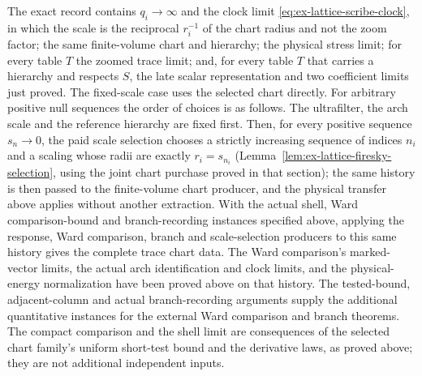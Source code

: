 The exact record contains $q_i\to\infty$ and the clock limit
\eqref{eq:ex-lattice-scribe-clock}, in which the scale is the reciprocal
$r_i^{-1}$ of the chart radius and not the zoom factor;
the same finite-volume
chart and hierarchy; the physical stress limit; for every table $T$ the
zoomed trace limit; and, for every table $T$ that carries a hierarchy and
respects $S$, the late scalar representation and two coefficient limits
just proved. The fixed-scale case uses the selected
chart directly. For arbitrary positive null sequences the order of choices
is as follows. The ultrafilter, the arch scale and the reference hierarchy
are fixed first. Then, for every positive sequence $s_n\to0$, the paid
scale selection chooses a strictly increasing sequence of indices $n_i$
and a scaling whose radii are exactly $r_i=s_{n_i}$
(Lemma~\ref{lem:ex-lattice-firesky-selection}, using the joint
chart purchase proved in that section); the same history is then passed to the
finite-volume chart producer, and the physical transfer above applies
without another extraction. With the actual shell, Ward comparison-bound and branch-recording instances
specified above, applying the response, Ward comparison, branch and scale-selection
producers to this same history gives the complete trace chart data. The Ward comparison's marked-vector limits, the actual
arch identification and clock limits, and the physical-energy
normalization have been proved above on that history. The
tested-bound, adjacent-column and actual branch-recording arguments
supply the additional quantitative instances for the external Ward comparison
and branch theorems. The
compact comparison and the shell limit are consequences of the
selected chart family's uniform short-test bound and the derivative laws,
as proved above; they are not additional independent inputs.
